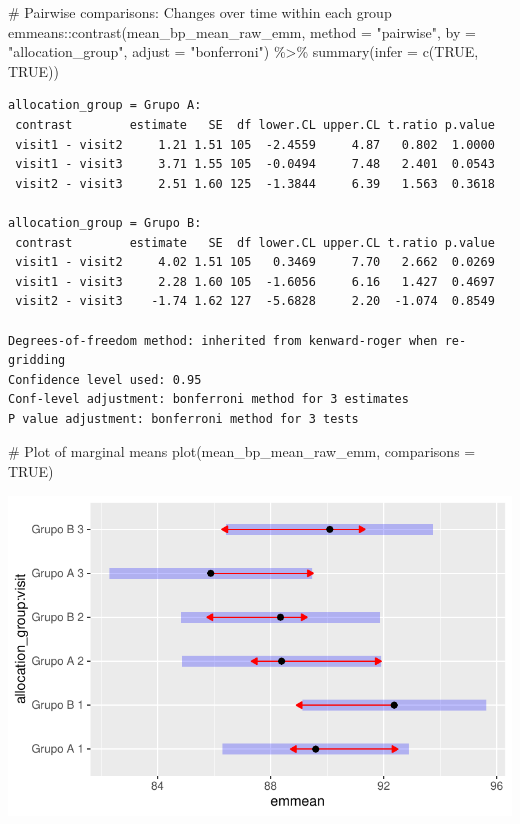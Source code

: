 \documentclass[
  12pt,
]{article}
\newenvironment{Shaded}{\begin{snugshade}}{\end{snugshade}}
\newcommand{\AttributeTok}[1]{\textcolor[rgb]{0.40,0.45,0.13}{#1}}
\newcommand{\CommentTok}[1]{\textcolor[rgb]{0.37,0.37,0.37}{#1}}
\newcommand{\ConstantTok}[1]{\textcolor[rgb]{0.56,0.35,0.01}{#1}}
\newcommand{\FunctionTok}[1]{\textcolor[rgb]{0.28,0.35,0.67}{#1}}
\newcommand{\NormalTok}[1]{\textcolor[rgb]{0.00,0.23,0.31}{#1}}
\newcommand{\SpecialCharTok}[1]{\textcolor[rgb]{0.37,0.37,0.37}{#1}}
\newcommand{\StringTok}[1]{\textcolor[rgb]{0.13,0.47,0.30}{#1}}
\begin{document}
\begin{Shaded}
\begin{Highlighting}[]
\CommentTok{\# Pairwise comparisons: Changes over time within each group}
\NormalTok{emmeans}\SpecialCharTok{::}\FunctionTok{contrast}\NormalTok{(mean\_bp\_mean\_raw\_emm,}
\AttributeTok{method =} \StringTok{"pairwise"}\NormalTok{, }\AttributeTok{by =} \StringTok{"allocation\_group"}\NormalTok{,}
\AttributeTok{adjust =} \StringTok{"bonferroni"}\NormalTok{) }\SpecialCharTok{\%\textgreater{}\%} \FunctionTok{summary}\NormalTok{(}\AttributeTok{infer =} \FunctionTok{c}\NormalTok{(}\ConstantTok{TRUE}\NormalTok{, }\ConstantTok{TRUE}\NormalTok{))}
\end{Highlighting}
\end{Shaded}

\begin{verbatim}
allocation_group = Grupo A:
 contrast        estimate   SE  df lower.CL upper.CL t.ratio p.value
 visit1 - visit2     1.21 1.51 105  -2.4559     4.87   0.802  1.0000
 visit1 - visit3     3.71 1.55 105  -0.0494     7.48   2.401  0.0543
 visit2 - visit3     2.51 1.60 125  -1.3844     6.39   1.563  0.3618

allocation_group = Grupo B:
 contrast        estimate   SE  df lower.CL upper.CL t.ratio p.value
 visit1 - visit2     4.02 1.51 105   0.3469     7.70   2.662  0.0269
 visit1 - visit3     2.28 1.60 105  -1.6056     6.16   1.427  0.4697
 visit2 - visit3    -1.74 1.62 127  -5.6828     2.20  -1.074  0.8549

Degrees-of-freedom method: inherited from kenward-roger when re-gridding 
Confidence level used: 0.95 
Conf-level adjustment: bonferroni method for 3 estimates 
P value adjustment: bonferroni method for 3 tests 
\end{verbatim}

\begin{Shaded}
\begin{Highlighting}[]
\CommentTok{\# Plot of marginal means}
\FunctionTok{plot}\NormalTok{(mean\_bp\_mean\_raw\_emm, }\AttributeTok{comparisons =} \ConstantTok{TRUE}\NormalTok{)}
\end{Highlighting}
\end{Shaded}

\includegraphics{Outcomes_files/figure-pdf/mean_bp_mean_raw_emm-1.pdf}
\end{document}
